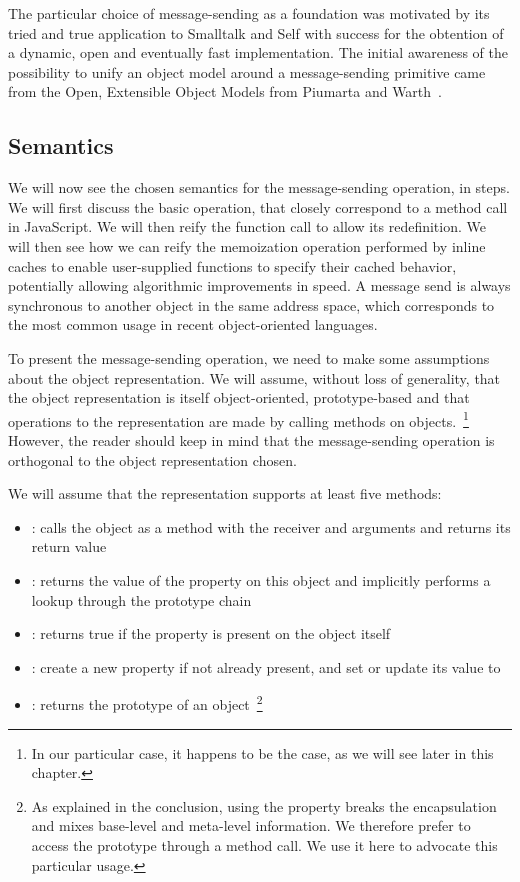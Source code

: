 The particular choice of message-sending as a foundation was motivated by its
tried and true application to Smalltalk and Self with success for the obtention
of a dynamic, open and eventually fast implementation. The initial awareness of
the possibility to unify an object model around a message-sending primitive
came from the Open, Extensible Object Models from Piumarta and
Warth~\cite{Piumarta:2008}.

\subsection{Semantics}

We will now see the chosen semantics for the message-sending operation, in
steps. We will first discuss the basic operation, that closely correspond to a
method call in JavaScript. We will then reify the function call to allow its
redefinition. We will then see how we can reify the memoization operation
performed by inline caches to enable user-supplied functions to specify their
cached behavior, potentially allowing algorithmic improvements in speed. A
message send is always synchronous to another object in the same address space,
which corresponds to the most common usage in recent object-oriented
languages.

To present the message-sending operation, we need to make some assumptions
about the object representation. We will assume, without loss of generality,
that the object representation is itself object-oriented, prototype-based and
that operations to the representation are made by calling methods on
objects.~\footnote{In our particular case, it happens to be the case, as
we will see later in this chapter.} However, the reader should keep in mind
that the message-sending operation is orthogonal to the object representation
chosen. 

We will assume that the representation supports at least five methods:
\begin{itemize}
    \item {}: calls the object as a method with the
     receiver and  arguments and returns its return value
    \item {}: returns the value of the  property on
    this object and implicitly performs a lookup through the prototype chain
    \item {}: returns true if the 
    property is present on the object itself
    \item {}: create a new  property if not already
    present, and set or update its value to  
    \item {}: returns the prototype of an
    object~\footnote{As explained in the conclusion, using the 
    property breaks the encapsulation and mixes base-level and meta-level
    information. We therefore prefer to access the prototype through a method
    call. We use it here to advocate this particular usage.}
\end{itemize}


